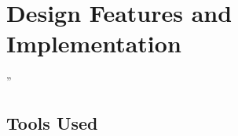 \chapter{Design Features and Implementation} %
\label{chap:Chapter4}  %

\epigraph{” }{\textit{}}



\section{Tools Used} \label{sec:design-tools}
